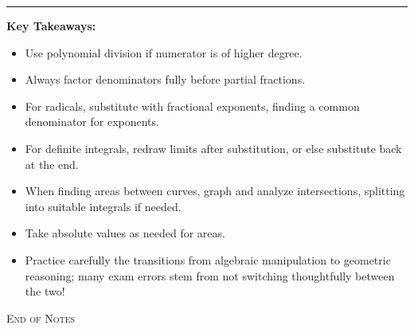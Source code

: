 \documentclass[12pt]{article}
\begin{document}
\vspace{2em}
\begin{center}
    \rule{0.7\textwidth}{0.6pt}
\end{center}
\vspace{0.7em}
\textbf{Key Takeaways:}
\begin{itemize}[leftmargin=1.6em]
    \item Use polynomial division if numerator is of higher degree.
    \item Always factor denominators fully before partial fractions.
    \item For radicals, substitute with fractional exponents, finding a common denominator for exponents.
    \item For definite integrals, redraw limits after substitution, or else substitute back at the end.
    \item When finding areas between curves, graph and analyze intersections, splitting into suitable integrals if needed.
    \item Take absolute values as needed for areas.
    \item Practice carefully the transitions from algebraic manipulation to geometric reasoning; many exam errors stem from not switching thoughtfully between the two!
\end{itemize}

\begin{center}
    \textsc{End of Notes}
\end{center}
\end{document}
